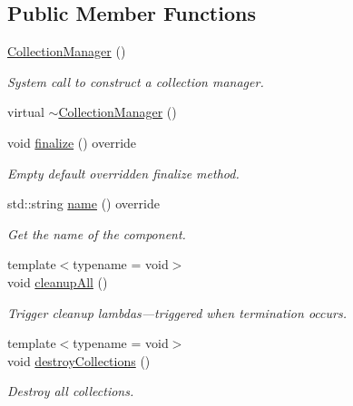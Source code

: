 \subsection*{Public Member Functions}
\begin{DoxyCompactItemize}
\item 
\hyperlink{structvt_1_1vrt_1_1collection_1_1_collection_manager_ad6c6c75f1f54ae5470847311256ae8c3}{Collection\+Manager} ()
\begin{DoxyCompactList}\small\item\em System call to construct a collection manager. \end{DoxyCompactList}\item 
virtual \hyperlink{structvt_1_1vrt_1_1collection_1_1_collection_manager_aea0c10371b37041bcc855eef0c767b85}{$\sim$\+Collection\+Manager} ()
\item 
void \hyperlink{structvt_1_1vrt_1_1collection_1_1_collection_manager_afafcdbf36f42835471218b654252031c}{finalize} () override
\begin{DoxyCompactList}\small\item\em Empty default overridden finalize method. \end{DoxyCompactList}\item 
std\+::string \hyperlink{structvt_1_1vrt_1_1collection_1_1_collection_manager_af7cc4c83ae2792595eee99a3206ed633}{name} () override
\begin{DoxyCompactList}\small\item\em Get the name of the component. \end{DoxyCompactList}\item 
{\footnotesize template$<$typename  = void$>$ }\\void \hyperlink{structvt_1_1vrt_1_1collection_1_1_collection_manager_a7d98e5aaa63d70cbabfbcf78a6cf503f}{cleanup\+All} ()
\begin{DoxyCompactList}\small\item\em Trigger cleanup lambdas---triggered when termination occurs. \end{DoxyCompactList}\item 
{\footnotesize template$<$typename  = void$>$ }\\void \hyperlink{structvt_1_1vrt_1_1collection_1_1_collection_manager_a71865b0508bab58b6d44b44416f11983}{destroy\+Collections} ()
\begin{DoxyCompactList}\small\item\em Destroy all collections. \end{DoxyCompactList}\item 

\end{DoxyCompactItemize}
